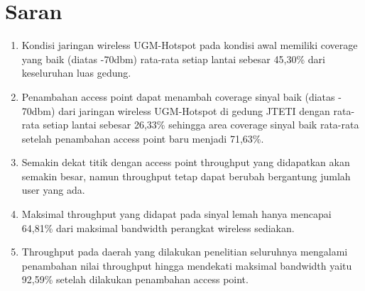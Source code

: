 \section{Saran}
	\begin{enumerate}
		\item
		Kondisi jaringan wireless UGM-Hotspot pada kondisi awal memiliki coverage yang baik (diatas -70dbm) rata-rata setiap lantai sebesar 45,30\% dari keseluruhan luas gedung.
		\item
		Penambahan access point dapat menambah coverage sinyal baik (diatas - 70dbm) dari jaringan wireless UGM-Hotspot di gedung JTETI dengan rata-rata setiap lantai sebesar 26,33\% sehingga area coverage sinyal baik rata-rata setelah penambahan access point baru menjadi 71,63\%.
		\item
		Semakin dekat titik dengan access point throughput yang didapatkan akan semakin besar, namun throughput tetap dapat berubah bergantung jumlah user yang ada.
		\item
		Maksimal throughput yang didapat pada sinyal lemah hanya mencapai 64,81\% dari maksimal bandwidth perangkat wireless sediakan.
		\item
		Throughput pada daerah yang dilakukan penelitian seluruhnya mengalami penambahan nilai throughput hingga mendekati maksimal bandwidth yaitu 92,59\% setelah dilakukan penambahan access point.
	\end{enumerate}

	